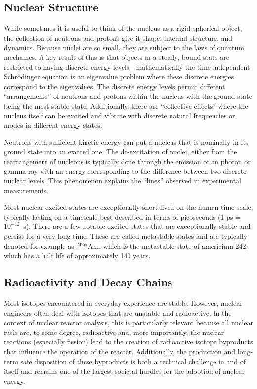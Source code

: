 \subsection{Nuclear Structure}

While sometimes it is useful to think of the nucleus as a rigid spherical object, the collection of neutrons and protons give it shape, internal structure, and dynamics. Because nuclei are so small, they are subject to the laws of quantum mechanics. A key result of this is that objects in a steady, bound state are restricted to having discrete energy levels---mathematically the time-independent Schr\"{o}dinger equation is an eigenvalue problem where these discrete energies correspond to the eigenvalues. The discrete energy levels permit different ``arrangements'' of neutrons and protons within the nucleus with the ground state being the most stable state. Additionally, there are ``collective effects'' where the nucleus itself can be excited and vibrate with discrete natural frequencies or modes in different energy states.

Neutrons with sufficient kinetic energy can put a nucleus that is nominally in its ground state into an excited one. The de-excitation of nuclei, either from the rearrangement of nucleons is typically done through the emission of an photon or gamma ray with an energy corresponding to the difference between two discrete nuclear levels. This phenomenon explains the ``lines'' observed in experimental measurements.

Most nuclear excited states are exceptionally short-lived on the human time scale, typically lasting on a timescale best described in terms of picoseconds (1 ps = $10^{-12}$~s). There are a few notable excited states that are exceptionally stable and persist for a very long time. These are called metastable states and are typically denoted for example as $^{242\text{m}}$Am, which is the metastable state of americium-242, which has a half life of approximately 140 years.

\subsection{Radioactivity and Decay Chains}

Most isotopes encountered in everyday experience are stable. However, nuclear engineers often deal with isotopes that are unstable and radioactive. In the context of nuclear reactor analysis, this is particularly relevant because all nuclear fuels are, to some degree, radioactive and, more importantly, the nuclear reactions (especially fission) lead to the creation of radioactive isotope byproducts that influence the operation of the reactor. Additionally, the production and long-term safe disposition of these byproducts is both a technical challenge in and of itself and remains one of the largest societal hurdles for the adoption of nuclear energy.

